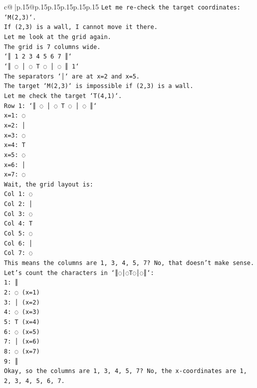 \documentclass{article}
\begin{document}
{\begin{supertabular}{c@{$\;$}|p{.15\linewidth}@{}p{.15\linewidth}p{.15\linewidth}p{.15\linewidth}p{.15\linewidth}p{.15\linewidth}}
{{{\texttt{Let me re{-}check the target coordinates: `M(2,3)`.} \\
\texttt{If (2,3) is a wall, I cannot move it there.} \\
\texttt{Let me look at the grid again.} \\
\texttt{The grid is 7 columns wide.} \\
\texttt{`║ 1 2 3 4 5 6 7 ║`} \\
\texttt{`║ ◌ │ ◌ T ◌ │ ◌ ║ 1`} \\
\texttt{The separators `│` are at x=2 and x=5.} \\
\texttt{The target `M(2,3)` is impossible if (2,3) is a wall.} \\
\texttt{Let me check the target `T(4,1)`.} \\
\texttt{Row 1: `║ ◌ │ ◌ T ◌ │ ◌ ║`} \\
\texttt{x=1: ◌} \\
\texttt{x=2: │} \\
\texttt{x=3: ◌} \\
\texttt{x=4: T} \\
\texttt{x=5: ◌} \\
\texttt{x=6: │} \\
\texttt{x=7: ◌} \\
\texttt{Wait, the grid layout is:} \\
\texttt{Col 1: ◌} \\
\texttt{Col 2: │} \\
\texttt{Col 3: ◌} \\
\texttt{Col 4: T} \\
\texttt{Col 5: ◌} \\
\texttt{Col 6: │} \\
\texttt{Col 7: ◌} \\
\texttt{This means the columns are 1, 3, 4, 5, 7? No, that doesn't make sense.} \\
\texttt{Let's count the characters in `║◌│◌T◌│◌║`:} \\
\texttt{1: ║} \\
\texttt{2: ◌ (x=1)} \\
\texttt{3: │ (x=2)} \\
\texttt{4: ◌ (x=3)} \\
\texttt{5: T (x=4)} \\
\texttt{6: ◌ (x=5)} \\
\texttt{7: │ (x=6)} \\
\texttt{8: ◌ (x=7)} \\
\texttt{9: ║} \\
\texttt{Okay, so the columns are 1, 3, 4, 5, 7? No, the x{-}coordinates are 1, 2, 3, 4, 5, 6, 7.} \\
}}}
\end{supertabular}}
\end{document}
